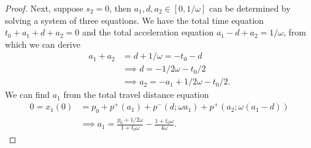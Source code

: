 \documentclass[a4paper]{article}
\theoremstyle{definition}
\theoremstyle{plain}
\begin{document}
\begin{proof}
  Next, suppose $s_{2} = 0$, then $a_{1},d,a_{2} \in [0, 1/\omega]$ can be
  determined by solving a system of three equations. We have the total time
  equation $t_{0} + a_{1} + d + a_{2} = 0$ and the total acceleration equation
  $a_{1} - d + a_{2} = 1 / \omega$, from which we can derive
  \begin{align*}
    a_{1} + a_{2} &= d + 1/\omega = -t_{0} - d  \\
    &\implies d = -1/2\omega - t_{0}/2 \\
    &\implies a_{2} = -a_{1} + 1/2\omega - t_{0}/2.
  \end{align*}
  We can find $a_{1}$ from the total travel distance equation
  \begin{align*}
    0 = x_{1}(0) &= p_{0} + p^{+}(a_{1}) + p^{-}(d; \omega a_{1}) + p^{+}(a_{2}; \omega (a_{1} - d)) \\
    &\implies a_{1} = \frac{p_{0} + 1/2\omega}{1 + t_{0}\omega} - \frac{1 + t_{0}\omega}{4 \omega} .
  \end{align*}



\end{proof}
\end{document}
